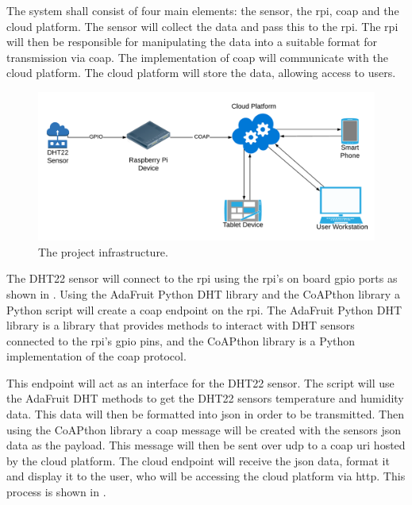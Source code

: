 The system shall consist of four main elements: the sensor, the \gls{rpi}, \gls{coap} and the cloud platform.
The sensor will collect the data and pass this to the \gls{rpi}. The \gls{rpi} will then be responsible for manipulating
the data into a suitable format for transmission via \gls{coap}. The implementation of \gls{coap} will communicate with
the cloud platform. The cloud platform will store the data, allowing access to users.

\begin{figure}[H]
    \centering
    \includegraphics[width=\imageWidth\textwidth]{assets/Project_Framework.png}
    \caption{\label{fig:proj_framework} The project infrastructure.}
\end{figure}


The DHT22 sensor will connect to the \gls{rpi} using the \gls{rpi}'s on board 
\gls{gpio} ports as shown in . 
Using the AdaFruit Python DHT library and the CoAPthon library a Python script 
will create a \gls{coap} endpoint on the \gls{rpi}.
The AdaFruit Python DHT library is a library that provides methods to interact 
with DHT sensors connected to the \gls{rpi}'s \gls{gpio} pins, 
and the CoAPthon library is a Python implementation of the \gls{coap} protocol.


This endpoint will act as an interface for the DHT22 sensor. 
The script will use the AdaFruit DHT methods to get the DHT22 sensors temperature 
and humidity data. This data will then be formatted into \gls{json} in order to 
be transmitted. Then using the CoAPthon library a \gls{coap} message will be created 
with the sensors \gls{json} data as the payload. This message will then be sent over
\gls{udp} to a \gls{coap} \gls{uri} hosted by the cloud platform. The cloud endpoint 
will receive the \gls{json} data, format it and display it to the user, who will 
be accessing the cloud platform via \gls{http}. This process is shown in .

